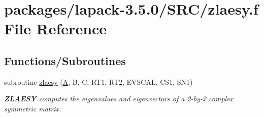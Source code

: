 \hypertarget{zlaesy_8f}{}\section{packages/lapack-\/3.5.0/\+S\+R\+C/zlaesy.f File Reference}
\label{zlaesy_8f}
\subsection*{Functions/\+Subroutines}
\begin{DoxyCompactItemize}
\item 
subroutine \hyperlink{group__complex16SYauxiliary_gade54011df54cab1e5e981e6a86ac2dc2}{zlaesy} (\hyperlink{classA}{A}, B, C, R\+T1, R\+T2, E\+V\+S\+C\+A\+L, C\+S1, S\+N1)
\begin{DoxyCompactList}\small\item\em {\bfseries Z\+L\+A\+E\+S\+Y} computes the eigenvalues and eigenvectors of a 2-\/by-\/2 complex symmetric matrix. \end{DoxyCompactList}\end{DoxyCompactItemize}
